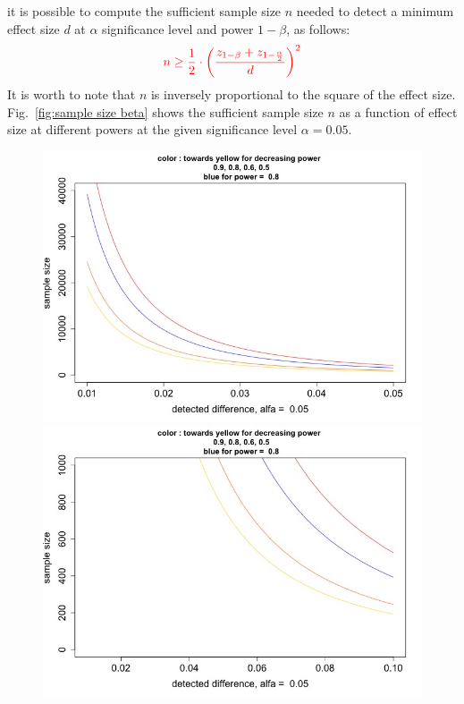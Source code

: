 \documentclass[14pt]{article}
\begin{document}
it is possible to compute the sufficient sample size $n$ needed to detect a minimum effect size $d$ at $\alpha$ significance level and power $1-\beta$, as follows:\\
\begin{equation}
\textcolor{red}{n\geq \frac{1}{2}\cdot\left ( \frac{z_{1-\beta}+z_{1-\frac{\alpha}{2}} }{d}\right )^{2}}
\end{equation}\newline
It is worth to note that $n$ is inversely proportional to the square of the effect size. Fig.~\ref{fig:sample size beta} shows the sufficient sample size $n$ as a function of effect size at different powers at the given significance level $\alpha=0.05$.
\begin{figure}[h!]
\centering
\begin{minipage}{0.31\textwidth}
  \centering
\includegraphics[scale=0.23]{plots/plot_samplesize VS effectsize_alfa_beta 1.jpg}  
\end{minipage}
\begin{minipage}{0.31\textwidth}
  \centering
\includegraphics[scale=0.23]{plots/plot_samplesize VS effectsize_alfa_beta 2.jpg}  

\end{minipage}
\end{figure}
\end{document}
